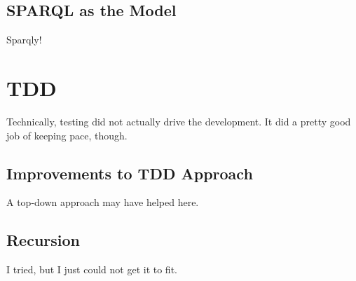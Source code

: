 \subsection{SPARQL as the Model}

Sparqly!


\section{TDD}

Technically, testing did not actually drive the development. It did a pretty good job of keeping pace, though.


\subsection{Improvements to TDD Approach}

A top-down approach may have helped here.


\subsection{Recursion}

I tried, but I just could not get it to fit.
